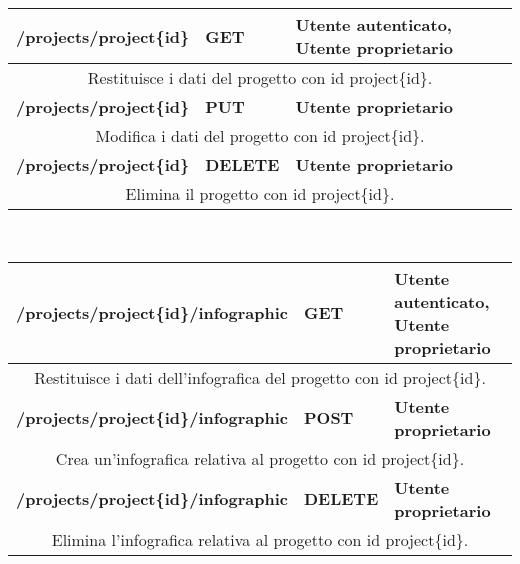 \begin{table}[H]
	\begin{tabular}{|p{}|p{}|p{}|}
		\toprule
		\textbf{/projects/project\{id\}} & \textbf{GET} & \textbf{Utente autenticato, Utente proprietario} \\ \midrule
		\multicolumn{3}{|c|}{Restituisce i dati del progetto con id project\{id\}.} \\ \midrule
		\textbf{/projects/project\{id\}} & \textbf{PUT} & \textbf{Utente proprietario} \\ \midrule
		\multicolumn{3}{|c|}{Modifica i dati del progetto con id project\{id\}.} \\ \midrule
		\textbf{/projects/project\{id\}} & \textbf{DELETE} & \textbf{Utente proprietario} \\ \midrule
		\multicolumn{3}{|c|}{Elimina il progetto con id project\{id\}.} \\
		\bottomrule
	\end{tabular}
	\\ \par\bigskip
	
	\begin{tabular}{|p{}|p{}|p{}|}
		\toprule
		\textbf{/projects/project\{id\}/infographic} & \textbf{GET} & \textbf{Utente autenticato, Utente proprietario} \\ \midrule
		\multicolumn{3}{|c|}{Restituisce i dati dell'\gls{infografica} del progetto con id project\{id\}.} \\
		\bottomrule
		\textbf{/projects/project\{id\}/infographic} & \textbf{POST} & \textbf{Utente proprietario} \\ \midrule
		\multicolumn{3}{|c|}{Crea un'\gls{infografica} relativa al progetto con id project\{id\}.} \\
		\bottomrule
		\textbf{/projects/project\{id\}/infographic} & \textbf{DELETE} & \textbf{Utente proprietario} \\ \midrule
		\multicolumn{3}{|c|}{Elimina l'\gls{infografica} relativa al progetto con id project\{id\}.} \\
		\bottomrule
	\end{tabular}\\
	\par\bigskip
	

\end{table}

